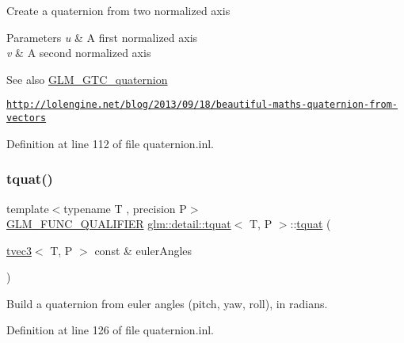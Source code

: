 Create a quaternion from two normalized axis


\begin{DoxyParams}{Parameters}
{\em u} & A first normalized axis \\
\hline
{\em v} & A second normalized axis \\
\hline
\end{DoxyParams}
\begin{DoxySeeAlso}{See also}
\hyperlink{group__gtc__quaternion}{G\+L\+M\+\_\+\+G\+T\+C\+\_\+quaternion} 

\href{http://lolengine.net/blog/2013/09/18/beautiful-maths-quaternion-from-vectors}{\tt http\+://lolengine.\+net/blog/2013/09/18/beautiful-\/maths-\/quaternion-\/from-\/vectors} 
\end{DoxySeeAlso}


Definition at line 112 of file quaternion.\+inl.

\mbox{\label{structglm_1_1detail_1_1tquat_acfc1714febec517f5313a91c3ae2e687}} 
\subsubsection{\texorpdfstring{tquat()}{tquat()}\hspace{0.1cm}{\footnotesize\ttfamily [6/9]}}
{\footnotesize\ttfamily template$<$typename T , precision P$>$ \\
\hyperlink{setup_8hpp_a33fdea6f91c5f834105f7415e2a64407}{G\+L\+M\+\_\+\+F\+U\+N\+C\+\_\+\+Q\+U\+A\+L\+I\+F\+I\+ER} \hyperlink{structglm_1_1detail_1_1tquat}{glm\+::detail\+::tquat}$<$ T, P $>$\+::\hyperlink{structglm_1_1detail_1_1tquat}{tquat} (\begin{DoxyParamCaption}\item[{\hyperlink{structglm_1_1detail_1_1tvec3}{tvec3}$<$ T, P $>$ const \&}]{euler\+Angles }\end{DoxyParamCaption})\hspace{0.3cm}{\ttfamily [explicit]}}



Build a quaternion from euler angles (pitch, yaw, roll), in radians. 



Definition at line 126 of file quaternion.\+inl.

\mbox{\label{structglm_1_1detail_1_1tquat_a84d40b0f5ab95f1e5ce01596c909fa25}} 
